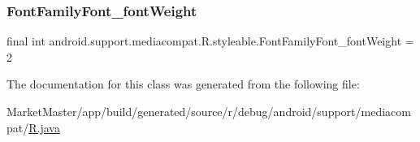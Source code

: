 \mbox{\label{classandroid_1_1support_1_1mediacompat_1_1R_1_1styleable_a3e4dffd2fc80e148b73a70308ab7c0a7}} 
\subsubsection{\texorpdfstring{Font\+Family\+Font\+\_\+font\+Weight}{FontFamilyFont\_fontWeight}}
{\footnotesize\ttfamily final int android.\+support.\+mediacompat.\+R.\+styleable.\+Font\+Family\+Font\+\_\+font\+Weight = 2\hspace{0.3cm}{\ttfamily [static]}}



The documentation for this class was generated from the following file\+:\begin{DoxyCompactItemize}
\item 
Market\+Master/app/build/generated/source/r/debug/android/support/mediacompat/\mbox{\hyperlink{debug_2android_2support_2mediacompat_2R_8java}{R.\+java}}\end{DoxyCompactItemize}
